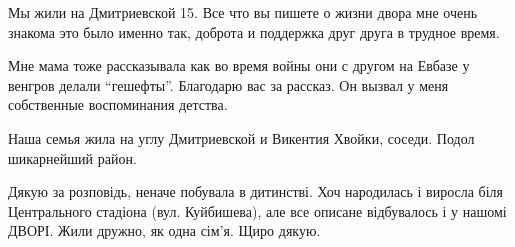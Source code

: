 \begin{itemize}
Мы жили на Дмитриевской 15. Все что вы пишете о жизни двора мне очень знакома
это было именно так, доброта и поддержка друг друга в трудное время.

Мне мама тоже рассказывала как во время войны они с другом на Евбазе у венгров
делали \enquote{гешефты}. Благодарю вас за рассказ. Он вызвал у меня собственные
воспоминания детства.


Наша семья жила на углу Дмитриевской и Викентия Хвойки, соседи. Подол шикарнейший район.


Дякую за розповідь, неначе побувала в дитинстві. Хоч народилась і виросла біля
Центрального стадіона (вул. Куйбишева), але все описане відбувалось і у нашомі
ДВОРІ. Жили дружно, як одна сім'я. Щиро дякую.


\end{itemize} %
